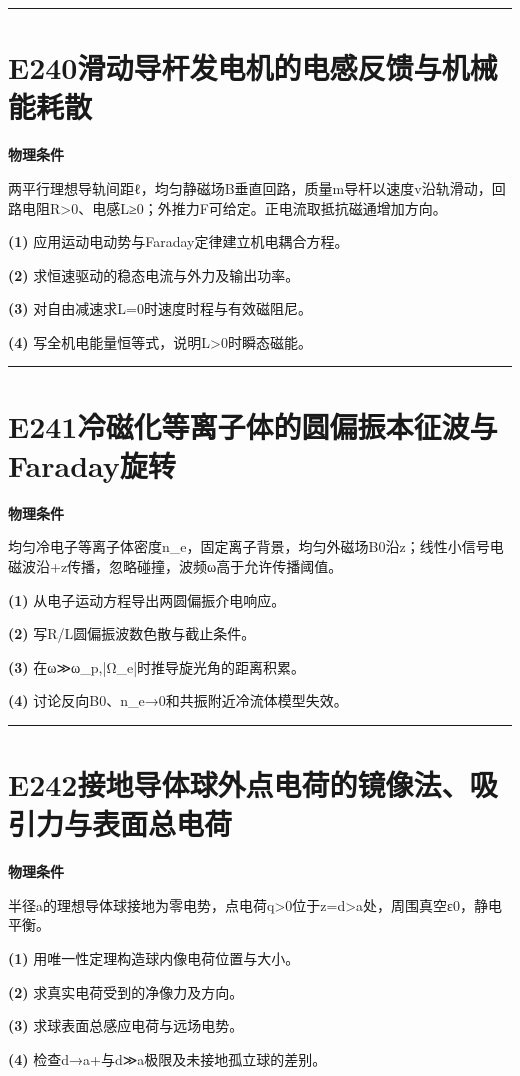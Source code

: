 \documentclass[UTF8,a4paper,11pt,oneside,openany]{ctexbook}
\begin{document}
\par\bigskip\hrule\bigskip
\section*{E240\quad 滑动导杆发电机的电感反馈与机械能耗散}
\textbf{物理条件}\par 两平行理想导轨间距ℓ，均匀静磁场B垂直回路，质量m导杆以速度v沿轨滑动，回路电阻R>0、电感L≥0；外推力F可给定。正电流取抵抗磁通增加方向。
\par\noindent\textbf{(1)} 应用运动电动势与Faraday定律建立机电耦合方程。
\par\noindent\textbf{(2)} 求恒速驱动的稳态电流与外力及输出功率。
\par\noindent\textbf{(3)} 对自由减速求L=0时速度时程与有效磁阻尼。
\par\noindent\textbf{(4)} 写全机电能量恒等式，说明L>0时瞬态磁能。

\par\bigskip\hrule\bigskip
\section*{E241\quad 冷磁化等离子体的圆偏振本征波与Faraday旋转}
\textbf{物理条件}\par 均匀冷电子等离子体密度n\_e，固定离子背景，均匀外磁场B0沿z；线性小信号电磁波沿+z传播，忽略碰撞，波频ω高于允许传播阈值。
\par\noindent\textbf{(1)} 从电子运动方程导出两圆偏振介电响应。
\par\noindent\textbf{(2)} 写R/L圆偏振波数色散与截止条件。
\par\noindent\textbf{(3)} 在ω≫ω\_p,|Ω\_e|时推导旋光角的距离积累。
\par\noindent\textbf{(4)} 讨论反向B0、n\_e→0和共振附近冷流体模型失效。

\par\bigskip\hrule\bigskip
\section*{E242\quad 接地导体球外点电荷的镜像法、吸引力与表面总电荷}
\textbf{物理条件}\par 半径a的理想导体球接地为零电势，点电荷q>0位于z=d>a处，周围真空ε0，静电平衡。
\par\noindent\textbf{(1)} 用唯一性定理构造球内像电荷位置与大小。
\par\noindent\textbf{(2)} 求真实电荷受到的净像力及方向。
\par\noindent\textbf{(3)} 求球表面总感应电荷与远场电势。
\par\noindent\textbf{(4)} 检查d→a+与d≫a极限及未接地孤立球的差别。
\end{document}
